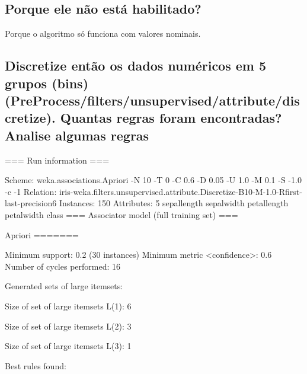\documentclass[12pt]{article}
\begin{document}
\subsection{Porque ele não está habilitado? }
Porque o algoritmo só funciona com valores nominais.

\subsection{Discretize então os dados numéricos em 5 grupos (bins) (PreProcess/filters/unsupervised/attribute/discretize). Quantas regras foram encontradas? Analise algumas regras}
=== Run information ===

Scheme:       weka.associations.Apriori -N 10 -T 0 -C 0.6 -D 0.05 -U 1.0 -M 0.1 -S -1.0 -c -1
Relation:     iris-weka.filters.unsupervised.attribute.Discretize-B10-M-1.0-Rfirst-last-precision6
Instances:    150
Attributes:   5
              sepallength
              sepalwidth
              petallength
              petalwidth
              class
=== Associator model (full training set) ===


Apriori
=======

Minimum support: 0.2 (30 instances)
Minimum metric <confidence>: 0.6
Number of cycles performed: 16

Generated sets of large itemsets:

Size of set of large itemsets L(1): 6

Size of set of large itemsets L(2): 3

Size of set of large itemsets L(3): 1

Best rules found:
\end{document}
